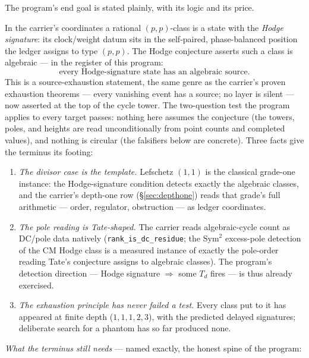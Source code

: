 \documentclass[11pt]{article}
\theoremstyle{definition}
\theoremstyle{remark}
\begin{document}
The program's end goal is stated plainly, with its logic and its price.

In the carrier's coordinates a rational $(p,p)$-class is a state with the
\emph{Hodge signature}: its clock/weight datum sits in the self-paired,
phase-balanced position the ledger assigns to type $(p,p)$. The Hodge
conjecture \cite{Hodge,DeligneClay} asserts such a class is algebraic --- in
the register of this program:
\[
  \boxed{\ \text{every Hodge-signature state has an algebraic source.}\ }
\]
This is a source-exhaustion statement, the same genre as the carrier's proven
exhaustion theorems --- every vanishing event has a source; no layer is silent
--- now asserted at the top of the cycle tower. The two-question test the
program applies to every target passes: nothing here assumes the conjecture
(the towers, poles, and heights are read unconditionally from point counts and
completed values), and nothing is circular (the falsifiers below are concrete).
Three facts give the terminus its footing:

\begin{enumerate}
\item \emph{The divisor case is the template.} Lefschetz $(1,1)$
\cite{Lefschetz} is the classical grade-one instance: the Hodge-signature
condition detects exactly the algebraic classes, and the carrier's depth-one
row (\S\ref{sec:depthone}) reads that grade's full arithmetic --- order,
regulator, obstruction --- as ledger coordinates.
\item \emph{The pole reading is Tate-shaped.} The carrier reads algebraic-cycle
count as DC/pole data natively (\texttt{rank\_is\_dc\_residue}; the
$\mathrm{Sym}^2$ excess-pole detection of the CM Hodge class is a measured
instance of exactly the pole-order reading Tate's conjecture \cite{TateConj}
assigns to algebraic classes). The program's detection direction --- Hodge
signature $\Rightarrow$ some $T_d$ fires --- is thus already exercised.
\item \emph{The exhaustion principle has never failed a test.} Every class
put to it has appeared at finite depth ($1,1,1,2,3$), with the predicted
delayed signatures; deliberate search for a phantom has so far produced none.
\end{enumerate}

\noindent\emph{What the terminus still needs} --- named exactly, the honest
spine of the program:
\end{document}

